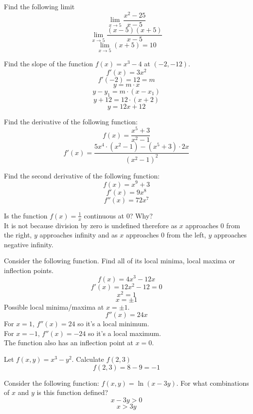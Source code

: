 \documentclass[10pt]{article}
\newenvironment{problem}[2][Problem]{\begin{trivlist}
\item[\hskip \labelsep {\bfseries #1}\hskip \labelsep {\bfseries #2.}]}{\end{trivlist}}
\begin{document}
\begin{problem}{3.2}
Find the following limit
$$\lim\limits_{x \rightarrow 5}\frac{x^2-25}{x-5}$$
$$\lim\limits_{x \rightarrow 5}\frac{(x-5)(x+5)}{x-5}$$
$$\lim\limits_{x \rightarrow 5}(x+5) = 10$$

\end{problem}

\begin{problem}{3.3}
Find the slope of the function $f(x)=x^3-4$ at $(-2,-12)$.
$$f'(x) = 3x^2$$
$$f'(-2) = 12 = m$$
$$y = m\cdot x$$
$$y-y_1 = m\cdot (x-x_1)$$
$$y+12 = 12\cdot(x+2)$$
$$y = 12x + 12$$
\end{problem}

\begin{problem}{3.4}
Find the derivative of the following function:
$$f(x)= \frac{x^5+3}{x^2-1}$$
$$ f'(x) = \frac{5x^4\cdot(x^2-1) - (x^5+3)\cdot 2x}{(x^2-1)^2} $$
\end{problem}

\begin{problem}{3.5}
Find the second derivative of the following function:
 $$f(x) = x^9+3$$
 $$f'(x) = 9x^8$$
 $$f''(x) = 72x^7$$
\end{problem}

\begin{problem}{3.6}
Is the function  $f(x)=\frac{1}{x}$ continuous at $0$? Why? \\
It is not because division by zero is undefined therefore as $x$ approaches 0 from the right, $y$ approaches infinity and as $x$ approaches 0 from the left, $y$ approaches negative infinity.
\end{problem}

\begin{problem}{3.7}
Consider the following function. Find all of its local minima, local maxima or inflection points. 
$$f(x)=4x^3-12x$$
$$f'(x) = 12x^2-12 = 0$$
$$ x^2 = 1 $$
$$ x = \pm 1 $$
Possible local minima/maxima at $x = \pm 1$.
$$f''(x) = 24x$$
For $x = 1$, $f''(x) = 24$ so it's a local minimum. \\
For $x = -1$, $f''(x) = -24$ so it's a local maximum.\\
The function also has an inflection point at $x = 0$.
\end{problem}

\begin{problem}{3.8}
Let $f(x,y)=x^3-y^2$. Calculate $f(2,3)$
$$ f(2,3) = 8-9 = -1 $$
\end{problem}

\begin{problem}{3.9}
Consider the following function: $f(x,y)=\ln(x-3y)$. For what combinations of $x$ and $y$ is this function defined?
\medskip \\
$$ x-3y > 0$$
$$ x>3y$$ 
\end{problem}
\end{document}
